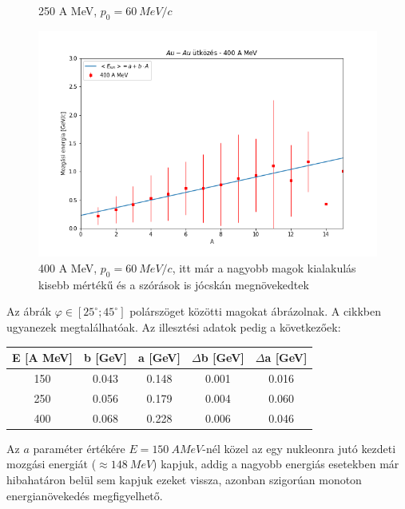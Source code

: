 \documentclass[a4paper,12pt]{article}
\begin{document}
\begin{figure}[H]
\begin{minipage}{.49\textwidth}
    \caption{250 A MeV, $p_{0} = 60 ~MeV/c$}
\end{minipage}
\begin{minipage}[c]{.8\textwidth}
\centering
    \includegraphics[width=\textwidth]{./400AMeV006mom2000adat.png}
    \caption{400 A MeV, $p_{0} = 60 ~MeV/c$, itt már a nagyobb magok kialakulás kisebb mértékű és a szórások is jócskán megnövekedtek}
\end{minipage}
\end{figure}

\par Az ábrák $\varphi \in [25^{\circ}; 45^{\circ}]$ polárszöget közötti magokat ábrázolnak. A \cite{REISDORF1997493} cikkben ugyanezek megtalálhatóak. Az illesztési adatok pedig a következőek:

\vspace{5mm}

\begin{center}
\begin{tabular}{|c|c|c|c|c|}
\hline
E [A MeV] & b [GeV] & a [GeV] & $\Delta$b [GeV] & $\Delta$a [GeV] \\
\hline
150 & 0.043 & 0.148 & 0.001 & 0.016 \\
\hline
250 & 0.056 & 0.179 & 0.004 & 0.060 \\
\hline
400 & 0.068 & 0.228 & 0.006 & 0.046 \\
\hline
\end{tabular}
\end{center}

\vspace{5mm}

\par Az $a$ paraméter értékére $E = 150 ~A MeV$-nél közel  az egy nukleonra jutó kezdeti mozgási energiát ($\approx 148 ~MeV$) kapjuk, addig a nagyobb energiás esetekben már hibahatáron belül sem kapjuk ezeket vissza, azonban szigorúan monoton energianövekedés megfigyelhető. 
 
\end{document}
